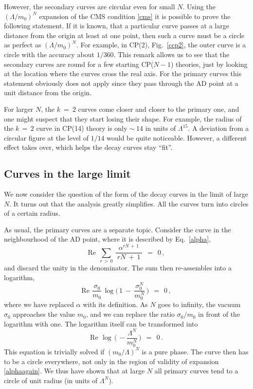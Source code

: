 \documentclass[epsfig,12pt]{article}
\def\beq{\begin{equation}}
\def\eeq{\end{equation}}
\def\beq{\begin{equation}}
\def\eeq{\end{equation}}
\begin{document}
	However, the secondary curves are circular even for small $ N $.
	Using the $ (\Lambda/m_0)^N $ expansion of the CMS condition \eqref{cms} it is possible to prove
	the following statement.
	If it is known, that a particular curve passes at a large distance from the origin at least
	at one point, then such a curve must be a circle as perfect as $ (\Lambda / m_0)^N $.
	For example, in CP(2), Fig.~\ref{ccp2}, the outer curve is a circle with the accuracy about $ 1/360 $.
	This remark allows us to see that the secondary curves are round for a few starting CP($ N-1 $) theories,
	just by looking at the location where the curves cross the real axis.
	For the primary curves this statement obviously does not apply since they pass through the AD point 
	at a unit distance from the origin.
	

	For larger $ N $, the $ k ~=~ 2 $ curves come closer and closer to the primary one, 
	and one might suspect that they start losing their shape.
	For example, the radius of the $ k \,=\, 2 $ curve in CP(14) theory is only $ \sim~14 $ in units of $ \Lambda^{15} $.
	A deviation from a circular figure at the level of $ 1/14 $ would be quite noticeable.
	However, a different effect takes over, which helps the decay curves stay ``fit''.


\subsection{Curves in the large  limit}

	We now consider the question of the form of the decay curves in the limit of large $ N $.
	It turns out that the analysis greatly simplifies.
	All the curves turn into circles of a certain radius. 

	As usual, the primary curves are a separate topic. 
	Consider the curve in the neighbourhood of the AD point, where it is described by Eq.~\eqref{alpha},
\beq
\label{alphaagain}
	\text{Re}~~ \sum_{r \,>\, 0}\: \frac{ \alpha^{r N \,+\, 1} }
                                          {\:  rN ~+~ 1 \:}          ~~=~~ 0\,,
\eeq
	and discard the unity in the denominator.
	The sum then re-assembles into a logarithm,
\beq
	\text{Re}~\, \frac{\sigma_0}{m_0}\,\log \Big(\, 1 \:-\: \frac{\sigma_0^N}{m_0^N} \,\Big)  ~~=~~ 0\,,
\eeq
	where we have replaced $ \alpha $ with its definition.
	As $ N $ goes to infinity, the vacuum $ \sigma_0 $ approaches the value $ m_0 $, and we can replace the ratio
	$ \sigma_0 / m_0 $ in front of the logarithm with one.
	The logarithm itself can be transformed into
\beq
	\text{Re}~\, \log\, \Big(\, -  \frac{\Lambda^N}{m_0^N} \,\Big) ~~=~~ 0\,.
\eeq
	This equation is trivially solved if $ (m_0/\Lambda)^N $ is a pure phase.
	The curve then has to be a circle everywhere, not only in the region of validity of expansion \eqref{alphaagain}.
	We thus have shown that at large $ N $ all primary curves tend to a circle of unit radius (in units of $ \Lambda^N $).
	
\end{document}
